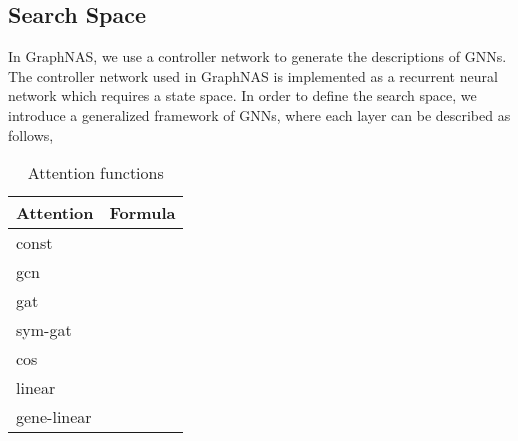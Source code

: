 \documentclass{article}
\begin{document}
\subsection{Search Space}
\label{Search Space}
In GraphNAS, we use a controller network to generate the descriptions of GNNs. The controller network used in GraphNAS is implemented as a recurrent neural network which requires a state space. In order to define the search space, we introduce a generalized framework of GNNs, where each layer can be described as follows, 
\begin{table}[]
	\caption{Attention functions }
	\label{operators}
	\begin{tabular}{l|l}
		\hline
		Attention & Formula \\ \hline
		const &  \\ \hline
		gcn &  \\ \hline
		gat &	   \\ \hline
		sym-gat  &	   \\ \hline
		cos &	   \\ \hline
		linear &	   \\ \hline
		gene-linear &	   \\ \hline
		
	\end{tabular}
\end{table}
\end{document}
